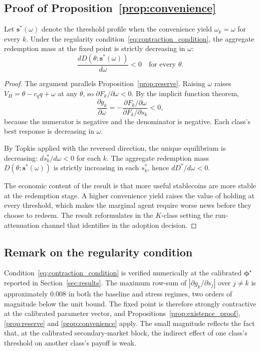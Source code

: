 \subsection*{Proof of Proposition~\ref{prop:convenience}}\label{sub:proof_p3}

\begin{proposition}\label{prop:convenience}
Let $\boldsymbol{s}^*(\omega)$ denote the threshold profile when the convenience yield $\omega_k = \omega$ for every $k$. Under the regularity condition~\eqref{eq:contraction_condition}, the aggregate redemption mass at the fixed point is strictly decreasing in $\omega$:
\[
\frac{d D(\theta; \boldsymbol{s}^*(\omega))}{d\omega} < 0 \quad \text{for every } \theta.
\]
\end{proposition}

\begin{proof}
The argument parallels Proposition~\ref{prop:reserve}. Raising $\omega$ raises $V_H = \theta - c_q q + \omega$ at any $\theta$, so $\partial F_k / \partial \omega < 0$. By the implicit function theorem,
\[
\frac{\partial g_k}{\partial \omega} = -\frac{\partial F_k / \partial \omega}{\partial F_k / \partial s_k} < 0,
\]
because the numerator is negative and the denominator is negative. Each class's best response is decreasing in $\omega$.

By Topkis applied with the reversed direction, the unique equilibrium is decreasing: $ds_k^*/d\omega < 0$ for each $k$. The aggregate redemption mass $D(\theta; \boldsymbol{s}^*(\omega))$ is strictly increasing in each $s_k^*$, hence $dD^*/d\omega < 0$.

The economic content of the result is that more useful stablecoins are more stable at the redemption stage. A higher convenience yield raises the value of holding at every threshold, which makes the marginal agent require worse news before they choose to redeem. The result reformulates in the $K$-class setting the run-attenuation channel that \citet{bertsch_2025_adoption_fragility} identifies in the adoption decision.
\end{proof}

\subsection*{Remark on the regularity condition}

Condition~\eqref{eq:contraction_condition} is verified numerically at the calibrated $\boldsymbol{\phi}^\star$ reported in Section~\ref{sec:results}. The maximum row-sum of $|\partial g_k / \partial s_j|$ over $j \neq k$ is approximately $0.008$ in both the baseline and stress regimes, two orders of magnitude below the unit bound. The fixed point is therefore strongly contractive at the calibrated parameter vector, and Propositions~\ref{prop:existence_proof}, \ref{prop:reserve} and \ref{prop:convenience} apply. The small magnitude reflects the fact that, at the calibrated secondary-market block, the indirect effect of one class's threshold on another class's payoff is weak.
